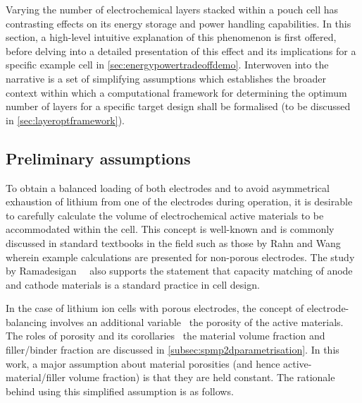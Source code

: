 

Varying the  number of electrochemical  layers stacked  within a pouch  cell has
contrasting effects  on its energy  storage and power handling  capabilities. In
this section,  a high-level  intuitive explanation of  this phenomenon  is first
offered, before  delving into  a detailed  presentation of  this effect  and its
implications for a specific  example cell in \cref{sec:energypowertradeoffdemo}.
Interwoven  into  the  narrative  is  a set  of  simplifying  assumptions  which
establishes  the broader  context  within which  a  computational framework  for
determining the optimum  number of layers for a specific  target design shall be
formalised (to be discussed in \cref{sec:layeroptframework}).

\subsection{Preliminary assumptions}\label{subsec:layeroptassumptions}

To  obtain a  balanced  loading of  both electrodes  and  to avoid  asymmetrical
exhaustion  of lithium  from  one  of the  electrodes  during  operation, it  is
desirable to carefully calculate the  volume of electrochemical active materials
to be accommodated  within the cell. This concept is  well-known and is commonly
discussed  in  standard  textbooks in  the  field  such  as  those by  Rahn  and
Wang~\cite{Rahn2013} wherein  example calculations are presented  for non-porous
electrodes. The study  by Ramadesigan~\etal~\cite{Ramadesigan2012} also supports
the  statement that  capacity  matching  of anode  and  cathode  materials is  a
standard practice in cell design.


In  the  case of  lithium  ion  cells with  porous  electrodes,  the concept  of
electrode-balancing  involves  an additional  variable  \viz~the porosity  of
the  active  materials.  The  roles  of porosity  and  its  corollaries  \ie~the
material   volume  fraction   and  filler/binder   fraction  are   discussed  in
\cref{subsec:spmp2dparametrisation}.  In this  work,  a  major assumption  about
material porosities  (and hence active-material/filler volume  fraction) is that
they are held constant. The rationale behind using this simplified assumption is
as follows.


